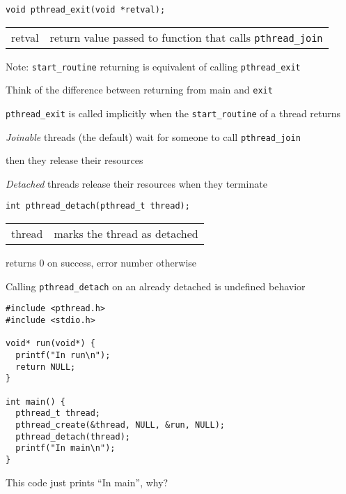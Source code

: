   \begin{slide}


    \begin{verbatim}
void pthread_exit(void *retval);
    \end{verbatim}
    \medskip

    \begin{tabular}{rl}
      retval & return value passed to function that calls {\tt pthread\_join} \\
    \end{tabular}
    \medskip
    
    Note: \texttt{start_routine} returning is equivalent of calling {\tt pthread\_exit}

    \leftspace{}Think of the difference between returning from main and
    \texttt{exit}
    \medskip

    {\tt pthread\_exit} is called implicitly when the {\tt start\_routine} of a
    thread returns

  \end{slide}

  \begin{slide}


    {\it Joinable} threads (the default) wait for someone to call
    {\tt pthread\_join}

    \leftspace{}then they release their resources
    \medskip

    {\it Detached} threads release their resources when they terminate
    \medskip

    \begin{verbatim}
int pthread_detach(pthread_t thread);
    \end{verbatim}
    \medskip

    \begin{tabular}{rl}
      thread & marks the thread as detached \\
    \end{tabular}

    returns 0 on success, error number otherwise
    \medskip

    Calling {\tt pthread\_detach} on an already detached is undefined
    behavior

  \end{slide}

  \begin{slide}


    \begin{verbatim}
#include <pthread.h>
#include <stdio.h>

void* run(void*) {
  printf("In run\n");
  return NULL;
}

int main() {
  pthread_t thread;
  pthread_create(&thread, NULL, &run, NULL);
  pthread_detach(thread);
  printf("In main\n");
}
    \end{verbatim}
    \medskip

    This code just prints ``In main'', why?

  \end{slide}

